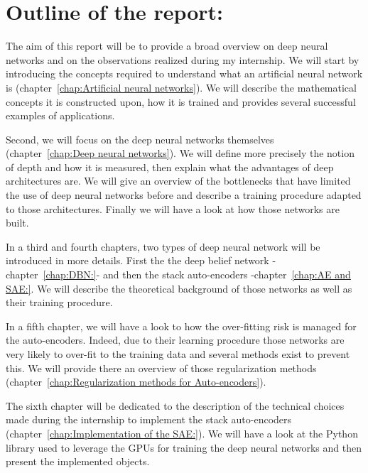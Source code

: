 \documentclass[a4paper,11pt]{report}
\begin{document}
  
		\section{Outline of the report:}
		\label{seq:Introduction/Outline of the report}    
		The aim of this report will be to provide a broad overview on deep neural networks and on the observations realized during my internship. We will start by introducing the concepts required to understand what an artificial neural network is (chapter~\ref{chap:Artificial neural networks}). We will describe the mathematical concepts it is constructed upon, how it is trained and provides several successful examples of applications.\\\par
		
		Second, we will focus on the deep neural networks themselves (chapter~\ref{chap:Deep neural networks}). We will define more precisely the notion of depth and how it is measured, then explain what the advantages of deep architectures are. We will give an overview of the bottlenecks that have limited the use of deep neural networks before and describe a training procedure adapted to those architectures. Finally we will have a look at how those networks are built.\\\par
				
		In a third and fourth chapters, two types of deep neural network will be introduced in more details. First the the deep belief network -chapter~\ref{chap:DBN:}- and then the stack auto-encoders -chapter~\ref{chap:AE and SAE:}. We will describe the theoretical background of those networks as well as their training procedure.
		
		In a fifth chapter, we will have a look to how the over-fitting risk is managed for the auto-encoders. Indeed, due to their learning procedure those networks are very likely to over-fit to the training data and several methods exist to prevent this. We will provide there an overview of those regularization methods (chapter~\ref{chap:Regularization methods for Auto-encoders}).\\\par
		
		The sixth chapter will be dedicated to the description of the technical choices made during the internship to implement the stack auto-encoders (chapter~\ref{chap:Implementation of the SAE:}). We will have a look at the Python library used to leverage the GPUs for training the deep neural networks and then present the implemented objects.\\\par
		
\end{document}
